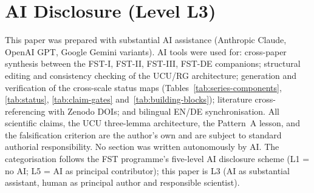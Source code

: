 \documentclass[11pt,a4paper]{article}
\theoremstyle{remark}
\begin{document}
\section*{AI Disclosure (Level L3)}
This paper was prepared with substantial AI assistance (Anthropic
Claude, OpenAI GPT, Google Gemini variants). AI tools were used for:
cross-paper synthesis between the FST-I, FST-II, FST-III, FST-DE
companions; structural editing and consistency checking of the
UCU/RG architecture; generation and verification of the cross-scale
status maps (Tables~\ref{tab:series-components},
\ref{tab:status}, \ref{tab:claim-gates}
and~\ref{tab:building-blocks}); literature
cross-referencing with Zenodo DOIs; and bilingual EN/DE
synchronisation. All scientific claims, the UCU three-lemma
architecture, the Pattern~A lesson, and the falsification criterion
are the author's own and are subject to standard authorial
responsibility. No section was written autonomously by AI.
The categorisation follows the FST programme's five-level AI
disclosure scheme (L1 = no AI; L5 = AI as principal contributor);
this paper is L3 (AI as substantial assistant, human as principal
author and responsible scientist).
\end{document}
